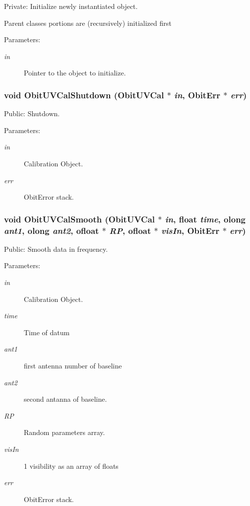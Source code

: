 Private: Initialize newly instantiated object. 

Parent classes portions are (recursively) initialized first \begin{Desc}
\item[Parameters:]
\begin{description}
\item[{\em in}]Pointer to the object to initialize. \end{description}
\end{Desc}
\subsubsection{\setlength{\rightskip}{0pt plus 5cm}void Obit\-UVCal\-Shutdown ({\bf Obit\-UVCal} $\ast$ {\em in}, {\bf Obit\-Err} $\ast$ {\em err})}\label{ObitUVCal_8c_a14}


Public: Shutdown. 

\begin{Desc}
\item[Parameters:]
\begin{description}
\item[{\em in}]Calibration Object. \item[{\em err}]Obit\-Error stack. \end{description}
\end{Desc}
\subsubsection{\setlength{\rightskip}{0pt plus 5cm}void Obit\-UVCal\-Smooth ({\bf Obit\-UVCal} $\ast$ {\em in}, float {\em time}, {\bf olong} {\em ant1}, {\bf olong} {\em ant2}, {\bf ofloat} $\ast$ {\em RP}, {\bf ofloat} $\ast$ {\em vis\-In}, {\bf Obit\-Err} $\ast$ {\em err})}\label{ObitUVCal_8c_a16}


Public: Smooth data in frequency. 

\begin{Desc}
\item[Parameters:]
\begin{description}
\item[{\em in}]Calibration Object. \item[{\em time}]Time of datum \item[{\em ant1}]first antenna number of baseline \item[{\em ant2}]second antanna of baseline. \item[{\em RP}]Random parameters array. \item[{\em vis\-In}]1 visibility as an array of floats \item[{\em err}]Obit\-Error stack. \end{description}
\end{Desc}
